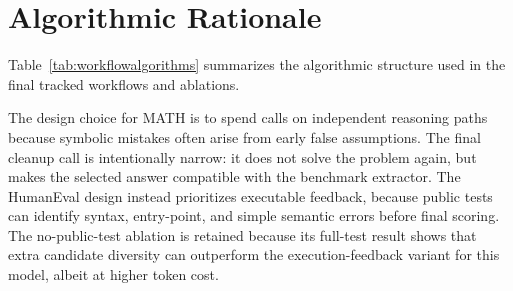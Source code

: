 \documentclass{article}
\begin{document}
\section{Algorithmic Rationale}

Table~\ref{tab:workflowalgorithms} summarizes the algorithmic structure used in the final tracked workflows and ablations.

\begin{table}[ht!]
\caption{Manual workflow algorithm structures.}
\label{tab:workflowalgorithms}
\vskip 0.08in
\centering
\begin{scriptsize}
\setlength{\tabcolsep}{3pt}
\end{scriptsize}
\end{table}

The design choice for MATH is to spend calls on independent reasoning paths because symbolic mistakes often arise from early false assumptions. The final cleanup call is intentionally narrow: it does not solve the problem again, but makes the selected answer compatible with the benchmark extractor. The HumanEval design instead prioritizes executable feedback, because public tests can identify syntax, entry-point, and simple semantic errors before final scoring. The no-public-test ablation is retained because its full-test result shows that extra candidate diversity can outperform the execution-feedback variant for this model, albeit at higher token cost.
\end{document}
